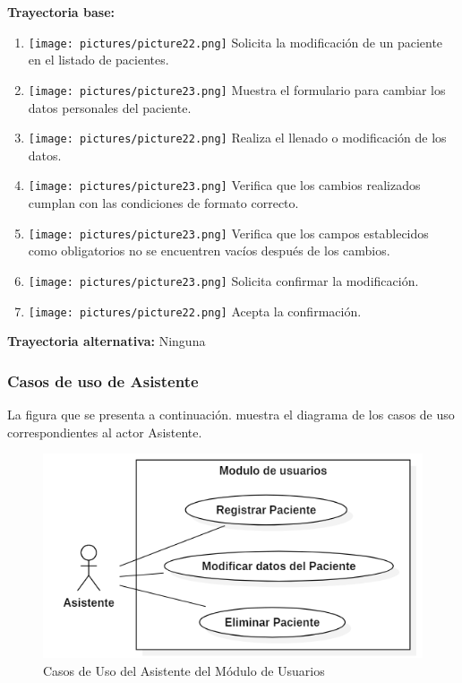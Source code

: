 \textbf{Trayectoria base:}        
\begin{enumerate}
\item \texttt{[image: pictures/picture22.png]} Solicita la modificación de un paciente en el listado de pacientes.
\item \texttt{[image: pictures/picture23.png]} Muestra el formulario para cambiar los datos personales del paciente.
\item \texttt{[image: pictures/picture22.png]} Realiza el llenado o modificación de los datos.
\item \texttt{[image: pictures/picture23.png]} Verifica que los cambios realizados cumplan con las condiciones de formato correcto.
\item \texttt{[image: pictures/picture23.png]} Verifica que los campos establecidos como obligatorios no se encuentren vacíos después de los cambios.
\item \texttt{[image: pictures/picture23.png]} Solicita confirmar la modificación.
\item \texttt{[image: pictures/picture22.png]} Acepta la confirmación.
\end{enumerate}
\textbf{Trayectoria alternativa:}  Ninguna

\newpage
\subsubsection{Casos de uso de Asistente}

La figura que se presenta a continuación. muestra el diagrama de los casos de uso correspondientes al actor Asistente.

\begin{figure}[H]
\centering
\includegraphics[width=12cm,keepaspectratio]{pictures/casosUsosAsistente.PNG}
\caption{Casos de Uso del Asistente del Módulo de Usuarios}
\end{figure}


